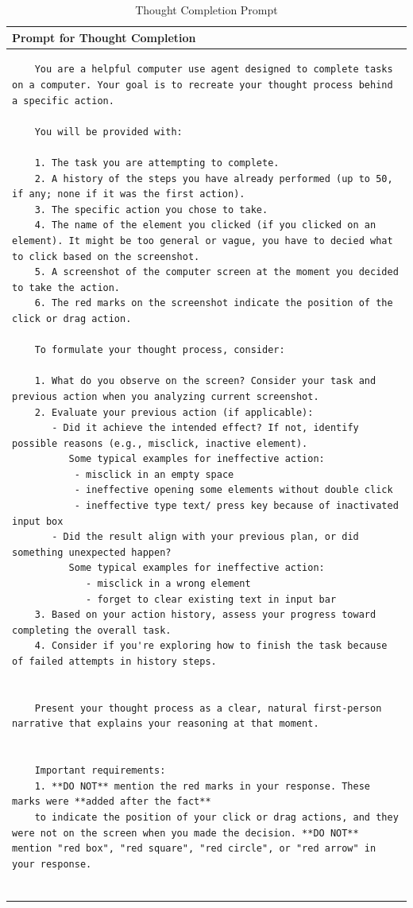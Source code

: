 \documentclass{article} %
\begin{document}
\begin{table}[h!]
    \caption{Thought Completion Prompt}
    \label{thought completion}
    \renewcommand{\arraystretch}{1}
    \begin{tabular}{>{\setlength{\parskip}{0.18em}}p{}}
    \toprule
    \textbf{Prompt for Thought Completion} \\
    \midrule
    \begin{lstlisting}
    You are a helpful computer use agent designed to complete tasks on a computer. Your goal is to recreate your thought process behind a specific action.

    You will be provided with:
    
    1. The task you are attempting to complete.
    2. A history of the steps you have already performed (up to 50, if any; none if it was the first action).
    3. The specific action you chose to take.
    4. The name of the element you clicked (if you clicked on an element). It might be too general or vague, you have to decied what to click based on the screenshot.
    5. A screenshot of the computer screen at the moment you decided to take the action.
    6. The red marks on the screenshot indicate the position of the click or drag action.
    
    To formulate your thought process, consider:
    
    1. What do you observe on the screen? Consider your task and previous action when you analyzing current screenshot.
    2. Evaluate your previous action (if applicable):
       - Did it achieve the intended effect? If not, identify possible reasons (e.g., misclick, inactive element).
          Some typical examples for ineffective action:
           - misclick in an empty space
           - ineffective opening some elements without double click
           - ineffective type text/ press key because of inactivated input box
       - Did the result align with your previous plan, or did something unexpected happen?
          Some typical examples for ineffective action:
             - misclick in a wrong element
             - forget to clear existing text in input bar
    3. Based on your action history, assess your progress toward completing the overall task.
    4. Consider if you're exploring how to finish the task because of failed attempts in history steps.
    
    
    Present your thought process as a clear, natural first-person narrative that explains your reasoning at that moment.
    
    
    Important requirements:
    1. **DO NOT** mention the red marks in your response. These marks were **added after the fact** 
    to indicate the position of your click or drag actions, and they were not on the screen when you made the decision. **DO NOT** mention "red box", "red square", "red circle", or "red arrow" in your response.
    
    \end{lstlisting}
    \end{tabular}
    \end{table}
    
\end{document}
